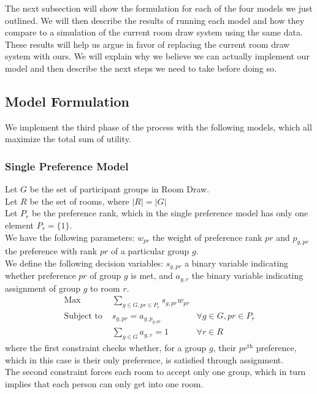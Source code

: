 \documentclass[12pt]{article}
\begin{document}
   The next subsection will show the formulation for each of the four models we just outlined. We will then describe the results of running each model and how they compare to a simulation of the current room draw system using the same data. These results will help us argue in favor of replacing the current room draw system with ours. We will explain why we believe we can actually implement our model and then describe the next steps we need to take before doing so. 
    
    \subsection*{Model Formulation}
    We implement the third phase of the process with the following models, which all maximize the total sum of utility.
    \subsubsection*{Single Preference Model}
    Let $G$ be the set of participant groups in Room Draw. \\
    Let $R$ be the set of rooms, where $|R| = |G|$ \\
    Let $P_r$ be the preference rank, which in the single preference model has only one element $P_r =\{1\}$. \\
We have the following parameters: $w_{pr}$ the weight of preference rank $pr$ and $p_{g,pr}$ the preference with rank $pr$ of a particular group $g$. \\
    We define the following decision variables: $s_{g,pr}$ a binary variable indicating whether preference $pr$ of group $g$ is met, and $a_{g,r}$ the binary variable indicating assignment of group $g$ to room $r$. 
    \begin{align*}
    \text{Max} &\sum_{g \in G, pr \in P_r} s_{g,pr}w_{pr}  & \\
    \text{Subject to } &s_{g,pr} = a_{g,p_{g,pr}} &\forall g \in G, pr \in P_r\\ 
    &\sum_{g \in G} a_{g,r} = 1 &\forall r \in R
    \end{align*}
    where the first constraint checks whether, for a group $g$, their $pr^{\text{th}}$ preference, which in this case is their only preference, is satisfied through assignment. \\
    The second constraint forces each room to accept only one group, which in turn implies that each person can only get into one room.
    
\end{document}
